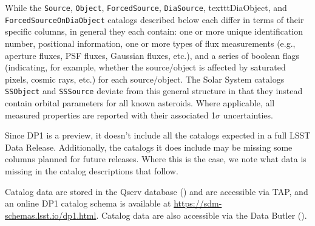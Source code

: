 While the \texttt{Source}, \texttt{Object}, \texttt{ForcedSource}, \texttt{DiaSource}, texttt{DiaObject}, and \texttt{ForcedSourceOnDiaObject} catalogs described below each differ in terms of their specific columns, in general they each contain: one or more unique identification number, positional information, one or more types of \gls{flux} measurements (e.g., aperture fluxes, PSF fluxes, Gaussian fluxes, etc.), and a series of boolean flags (indicating, for example, whether the source/object is affected by saturated pixels, cosmic rays, etc.) for each source/object.
The Solar System catalogs \texttt{SSObject} and \texttt{SSSource} deviate from this general structure in that they instead contain orbital parameters for all known asteroids.
Where applicable, all measured properties are reported with their associated 1$\sigma$ uncertainties.

Since \gls{DP1} is a preview, it doesn't include all the catalogs expected in a full LSST Data Release. Additionally, the catalogs it does include may be missing some columns planned for future releases.
Where this is the case, we note what data is missing in the catalog descriptions that follow.

Catalog data are stored in the Qserv database () and are accessible via \gls{TAP}, and an online \gls{DP1} catalog schema is available at \url{https://sdm-schemas.lsst.io/dp1.html}.
Catalog data are also accessible via the Data \gls{Butler} ().

